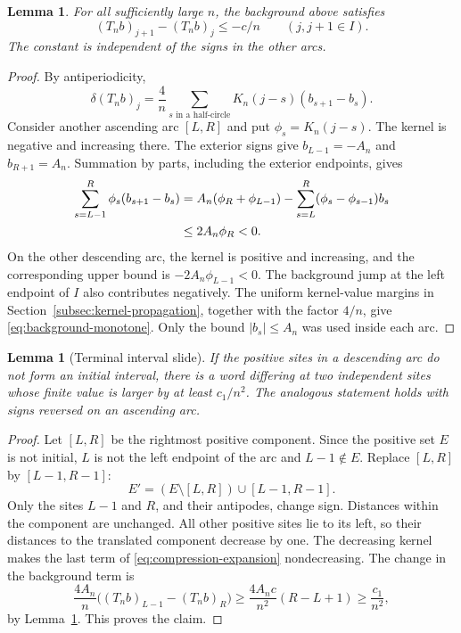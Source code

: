 \documentclass[11pt,reqno]{amsart}
\numberwithin{equation}{section}
\newtheorem{lemma}[theorem]{Lemma}
\theoremstyle{definition}
\theoremstyle{remark}
\newcommand{\dd}{\delta}
\begin{document}
\begin{lemma}\label{lem:background}
For all sufficiently large $n$, the background above satisfies
\begin{equation}\label{eq:background-monotone}
 (T_nb)_{j+1}-(T_nb)_j\le-c/n\qquad(j,j+1\in I).
\end{equation}
The constant is independent of the signs in the other arcs.
\end{lemma}
\begin{proof}
By antiperiodicity,
\[
 \dd(T_nb)_j=\frac4n\sum_{s\text{ in a half-circle}}
                 K_n(j-s)(b_{s+1}-b_s).
\]
Consider another ascending arc $[L,R]$ and put $\phi_s=K_n(j-s)$. The kernel is negative and increasing there. The exterior signs give $b_{L-1}=-A_n$ and $b_{R+1}=A_n$. Summation by parts, including the exterior endpoints, gives
\begin{align}\label{eq:background-endpoints}
 \sum_{s=L-1}^R\phi_s(b_{s+1}-b_s)
 &=A_n(\phi_R+\phi_{L-1})
   -\sum_{s=L}^R(\phi_s-\phi_{s-1})b_s\notag\\
 &\le2A_n\phi_R<0.
\end{align}
On the other descending arc, the kernel is positive and increasing, and the corresponding upper bound is $-2A_n\phi_{L-1}<0$. The background jump at the left endpoint of $I$ also contributes negatively. The uniform kernel-value margins in Section~\ref{subsec:kernel-propagation}, together with the factor $4/n$, give \eqref{eq:background-monotone}. Only the bound $|b_s|\le A_n$ was used inside each arc.
\end{proof}

\begin{lemma}[Terminal interval slide]\label{lem:terminal-slide}
If the positive sites in a descending arc do not form an initial interval, there is a word differing at two independent sites whose finite value is larger by at least $c_1/n^2$. The analogous statement holds with signs reversed on an ascending arc.
\end{lemma}
\begin{proof}
Let $[L,R]$ be the rightmost positive component. Since the positive set $E$ is not initial, $L$ is not the left endpoint of the arc and $L-1\notin E$. Replace $[L,R]$ by $[L-1,R-1]$:
\[
 E'=(E\setminus[L,R])\cup[L-1,R-1].
\]
Only the sites $L-1$ and $R$, and their antipodes, change sign. Distances within the component are unchanged. All other positive sites lie to its left, so their distances to the translated component decrease by one. The decreasing kernel makes the last term of \eqref{eq:compression-expansion} nondecreasing. The change in the background term is
\[
 \frac{4A_n}{n}\bigl((T_nb)_{L-1}-(T_nb)_R\bigr)
 \ge\frac{4A_nc}{n^2}(R-L+1)\ge\frac{c_1}{n^2},
\]
by Lemma~\ref{lem:background}. This proves the claim.
\end{proof}
\end{document}
